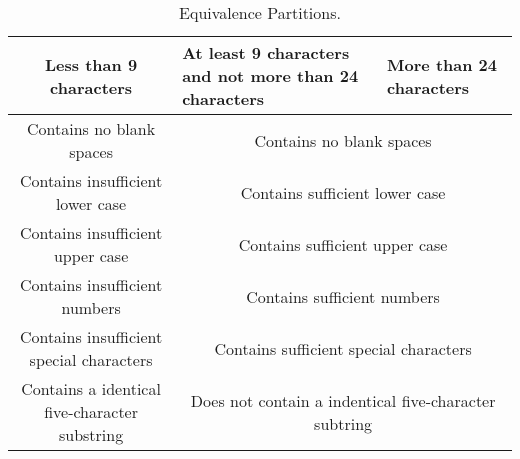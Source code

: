 \documentclass[12pt,letterpaper]{article}
\begin{document}
\begin{table}[h!]
  \begin{center}
    \caption{Equivalence Partitions.}
    \label{tab:Equiv partitions}
    
    \begin{tabular}{||c|m{4cm}|m{5cm}||}
    \hline
    Less than 9 characters & At least 9 characters and not more than 24
    characters & More than 24 characters \\
    
    \hline \hline
    \multicolumn{1}{||c|}{Contains no blank spaces} & \multicolumn{2}{c||}{Contains no blank spaces} \\
    
    \hline \hline
    \multicolumn{1}{||c|}{Contains insufficient lower case} 
    & \multicolumn{2}{c||}{Contains sufficient lower case} \\
    
    \hline \hline
    \multicolumn{1}{||c|}{Contains insufficient upper case} 
    & \multicolumn{2}{c||}{Contains sufficient upper case} \\
    
    \hline \hline
    \multicolumn{1}{||c|}{Contains insufficient numbers} 
    & \multicolumn{2}{c||}{Contains sufficient numbers} \\
    
    \hline \hline
    \multicolumn{1}{||c|}{Contains insufficient special characters} 
    & \multicolumn{2}{c||}{Contains sufficient special characters} \\
    
    \hline \hline
    \multicolumn{1}{||c|}{Contains a identical five-character substring}
    & \multicolumn{2}{c||}{Does not contain a indentical five-character subtring} \\
    \hline
    \end{tabular}
  \end{center}
\end{table}
\end{document}
